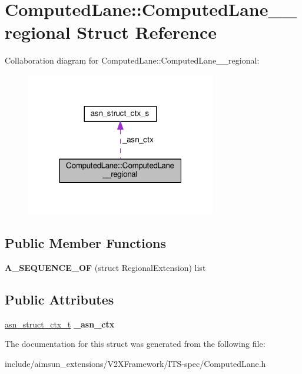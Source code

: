\hypertarget{structComputedLane_1_1ComputedLane____regional}{}\section{Computed\+Lane\+:\+:Computed\+Lane\+\_\+\+\_\+regional Struct Reference}
\label{structComputedLane_1_1ComputedLane____regional}


Collaboration diagram for Computed\+Lane\+:\+:Computed\+Lane\+\_\+\+\_\+regional\+:\nopagebreak
\begin{figure}[H]
\begin{center}
\leavevmode
\includegraphics[width=235pt]{structComputedLane_1_1ComputedLane____regional__coll__graph}
\end{center}
\end{figure}
\subsection*{Public Member Functions}
\begin{DoxyCompactItemize}
\item 
{\bfseries A\+\_\+\+S\+E\+Q\+U\+E\+N\+C\+E\+\_\+\+OF} (struct Regional\+Extension) list\hypertarget{structComputedLane_1_1ComputedLane____regional_adeb8139c37e4651b95e777d74e23403d}{}\label{structComputedLane_1_1ComputedLane____regional_adeb8139c37e4651b95e777d74e23403d}

\end{DoxyCompactItemize}
\subsection*{Public Attributes}
\begin{DoxyCompactItemize}
\item 
\hyperlink{structasn__struct__ctx__s}{asn\+\_\+struct\+\_\+ctx\+\_\+t} {\bfseries \+\_\+asn\+\_\+ctx}\hypertarget{structComputedLane_1_1ComputedLane____regional_a6daf9c086abe33a6fe48fc6138b26852}{}\label{structComputedLane_1_1ComputedLane____regional_a6daf9c086abe33a6fe48fc6138b26852}

\end{DoxyCompactItemize}


The documentation for this struct was generated from the following file\+:\begin{DoxyCompactItemize}
\item 
include/aimsun\+\_\+extensions/\+V2\+X\+Framework/\+I\+T\+S-\/spec/Computed\+Lane.\+h\end{DoxyCompactItemize}
